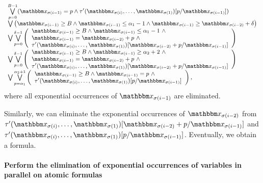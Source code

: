 \[
\small
\begin{array}{l}
\bigvee \limits_{p=0}^{B-1} ( \ivarx_{\sigma(i-1)} = p \wedge \tau'(\ivarx_{\sigma(i)}, \ldots, \ivarx_{\sigma(1)}) [p/\ivarx_{\sigma(i-1)}])   \\
\bigvee \big(\ivarx_{\sigma(i-1)} \ge B \wedge \ivarx_{\sigma(i-1)} \le \alpha_1  - 1  \wedge \ivarx_{\sigma(i-1)} \ge \ivarx_{\sigma(i-2)} +\delta \big)\\
%
\bigvee \bigvee \limits_{p=0}^{\delta-1} 
\left(
\begin{array}{l}
\ivarx_{\sigma(i-1)} \ge B \wedge \ivarx_{\sigma(i-1)} \le \alpha_1  -1 \ \wedge \\
 \ivarx_{\sigma(i-1)} = \ivarx_{\sigma(i-2)} +p\ \wedge\\
 \tau'(\ivarx_{\sigma(i)}, \ldots, \ivarx_{\sigma(1)})[\ivarx_{\sigma(i-2)} + p /\ivarx_{\sigma(i-1)}] 
\end{array}
\right)\\
\bigvee \bigvee \limits_{p=0}^{\delta-1} 
\left(
\begin{array}{l}
\ivarx_{\sigma(i-1)} \ge B \wedge \ivarx_{\sigma(i-1)} \ge \alpha_2 + 2 \ \wedge \\
 \ivarx_{\sigma(i-1)} = \ivarx_{\sigma(i-2)} +p\ \wedge\\
 \tau'(\ivarx_{\sigma(i)}, \ldots, \ivarx_{\sigma(1)})[\ivarx_{\sigma(i-2)} + p /\ivarx_{\sigma(i-1)}] 
\end{array}
\right)\\
\bigvee \bigvee \limits_{p = \alpha_1}^{\alpha_2 + 1}
\left(
\begin{array}{l}
\ivarx_{\sigma(i-1)} \ge B \wedge \ivarx_{\sigma(i-1)} = p\ \wedge \\
 \tau'(\ivarx_{\sigma(i)}, \ldots, \ivarx_{\sigma(1)})[p /\ivarx_{\sigma(i-1)}] 
\end{array}
\right),
\end{array}
\]
where all exponential occurrences of $\ivarx_{\sigma(i-1)}$ are eliminated.

Similarly, we can eliminate the exponential occurrences of $\ivarx_{\sigma(i-2)}$ from $\tau'(\ivarx_{\sigma(i)}, \ldots, \ivarx_{\sigma(1)})[\ivarx_{\sigma(i-2)} + p /\ivarx_{\sigma(i-1)}]$ and  $\tau'(\ivarx_{\sigma(i)}, \ldots, \ivarx_{\sigma(1)})[p /\ivarx_{\sigma(i-1)}]$. Eventually, we obtain a {\pa} formula.

\paragraph{Perform the elimination of exponential occurrences of variables in parallel on atomic formulas} \label{para: opt parallel}


